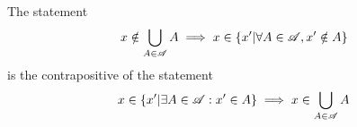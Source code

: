 \documentclass[main.tex]{subfiles}
\begin{document}
\subproblem{}\label{6b}

\begin{remark}
	The statement
	\[x \notin \bigcup\limits_{A \in \mathscr{A}} {A} \implies x \in \{x'|\forall A \in \mathscr{A}, x' \notin A\}\]
	is the contrapositive of the statement
	\[x \in \{x'|\exists A \in \mathscr{A} : x' \in A\} \implies x \in \bigcup\limits_{A \in \mathscr{A}} {A}\]
\end{remark}
\end{document}
